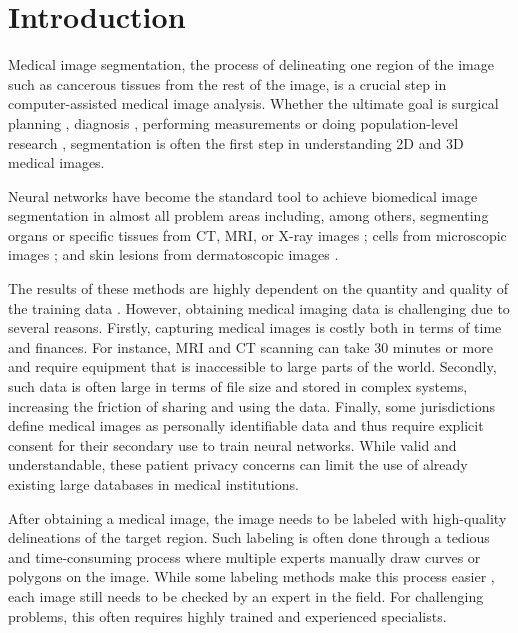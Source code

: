 	
\chapter{Introduction}
\label{chap:introduction}

Medical image segmentation, the process of delineating one region of the image such as cancerous tissues from the rest of the image, is a crucial step in computer-assisted medical image analysis. Whether the ultimate goal is surgical planning \cite{selleAnalysisVasculatureLiver2002}, diagnosis \cite{devunooruDeepLearningNeural2021}, performing measurements \cite{sobhaniniaFetalUltrasoundImage2019} or doing population-level research \cite{bastarrikaRelationshipCoronaryArtery2010}, segmentation is often the first step in understanding 2D and 3D medical images.

Neural networks have become the standard tool to achieve biomedical image segmentation in almost all problem areas including, among others, segmenting organs or specific tissues from CT, MRI, or X-ray images \cite{antonelliMedicalSegmentationDecathlon2022}; cells from microscopic images \cite{edlundLIVECellLargescaleDataset2021}; and skin lesions from dermatoscopic images \cite{codellaSkinLesionAnalysis2019c}.

The results of these methods are highly dependent on the quantity and quality of the training data \cite{choHowMuchData2016}. However, obtaining medical imaging data is challenging due to several reasons. Firstly, capturing medical images is costly both in terms of time and finances. For instance, MRI and CT scanning can take 30 minutes or more and require equipment that is inaccessible to large parts of the world. Secondly, such data is often large in terms of file size and stored in complex systems, increasing the friction of sharing and using the data. Finally, some jurisdictions define medical images as personally identifiable data \cite{lotanMedicalImagingPrivacy2020} and thus require explicit consent for their secondary use to train neural networks. While valid and understandable, these patient privacy concerns can limit the use of already existing large databases in medical institutions.

After obtaining a medical image, the image needs to be labeled with high-quality delineations of the target region. Such labeling is often done through a tedious and time-consuming process where multiple experts manually draw curves or polygons on the image. While some labeling methods make this process easier \cite{lutnickIntegratedIterativeAnnotation2019}, each image still needs to be checked by an expert in the field. For challenging problems, this often requires highly trained and experienced specialists.

